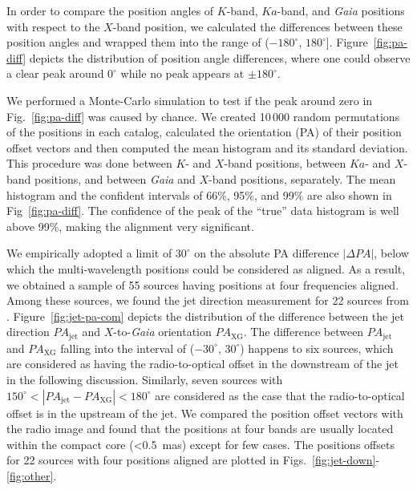 \documentclass[referee]{aa}        %
\begin{document}
    In order to compare the position angles of $K$-band, $Ka$-band, and \textit{Gaia} positions with respect to the $X$-band position,
    we calculated the differences between these position angles and wrapped them into the range of ($-180^\circ$, $180^\circ$].
    Figure~\ref{fig:pa-diff} depicts the distribution of position angle differences, where one could observe a clear peak around $0^\circ$ while no peak appears at $\pm 180^\circ$.

    We performed a Monte-Carlo simulation to test if the peak around zero in Fig.~\ref{fig:pa-diff} was caused by chance.
    We created 10\,000 random permutations of the positions in each catalog, calculated the orientation (PA) of their position offset vectors and then computed the mean histogram and its standard deviation.
    This procedure was done between $K$- and $X$-band positions, between $Ka$- and $X$-band positions, and between \textit{Gaia} and $X$-band positions, separately.
    The mean histogram and the confident intervals of 66\%, 95\%, and 99\% are also shown in Fig~\ref{fig:pa-diff}.
    The confidence of the peak of the ``true'' data histogram is well above 99\%, making the alignment very significant.

    We empirically adopted a limit of $30^\circ$ on the absolute PA difference $|\Delta PA|$, below which the multi-wavelength positions could be considered as aligned.
    As a result, we obtained a sample of 55 sources having positions at four frequencies aligned.
    Among these sources, we found the jet direction measurement for 22 sources from \citet{2019ApJ...874...43L}.
    Figure~\ref{fig:jet-pa-com} depicts the distribution of the difference between the jet direction $PA_\mathrm{jet}$ and $X$-to-\textit{Gaia} orientation $PA_\mathrm{XG}$.
    The difference between $PA_\mathrm{jet}$ and $PA_\mathrm{XG}$ falling into the interval of ($-30^\circ$, $30^\circ$) happens to six sources,
    which are considered as having the radio-to-optical offset in the downstream of the jet in the following discussion.
    Similarly, seven sources with $150^\circ < |PA_\mathrm{jet} - PA_\mathrm{XG}| < 180^\circ$ are considered as the case that the radio-to-optical offset is in the upstream of the jet.
    We compared the position offset vectors with the radio image and found that the positions at four bands are usually located within the compact core (<0.5~mas) except for few cases.
    The positions offsets for 22 sources with four positions aligned are plotted in Figs.~\ref{fig:jet-down}-\ref{fig:other}.
\end{document}
